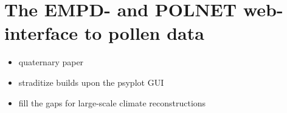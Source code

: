 
\chapter{The EMPD- and POLNET web-interface to pollen data}

\label{chp:empd}


\begin{itemize}
	\item quaternary paper
	\item straditize builds upon the psyplot GUI
    \item fill the gaps for large-scale climate reconstructions
\end{itemize}
